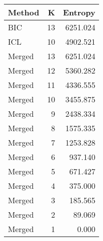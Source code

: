 \begin{center} 
\begin{tabular}{lrr}
 Method & K & Entropy \\ 
  \hline
\hline
BIC &   13 & 6251.024 \\ 
  ICL &   10 & 4902.521 \\ 
  Merged &   13 & 6251.024 \\ 
  Merged &   12 & 5360.282 \\ 
  Merged &   11 & 4336.555 \\ 
  Merged &   10 & 3455.875 \\ 
  Merged &    9 & 2438.334 \\ 
  Merged &    8 & 1575.335 \\ 
  Merged &    7 & 1253.828 \\ 
  Merged &    6 & 937.140 \\ 
  Merged &    5 & 671.427 \\ 
  Merged &    4 & 375.000 \\ 
  Merged &    3 & 185.565 \\ 
  Merged &    2 & 89.069 \\ 
  Merged &    1 & 0.000 \\ 
  \end{tabular}
\end{center} 
